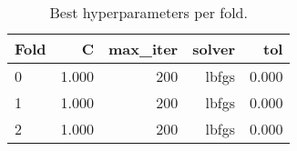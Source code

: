 \begin{table}
\caption{Best hyperparameters per fold.}
\label{tab:hyperparams}
\begin{tabular}{lrrrr}
\toprule
Fold & C & max\_iter & solver & tol \\
\midrule
0 & 1.000 & 200 & lbfgs & 0.000 \\
1 & 1.000 & 200 & lbfgs & 0.000 \\
2 & 1.000 & 200 & lbfgs & 0.000 \\
\bottomrule
\end{tabular}
\end{table}
